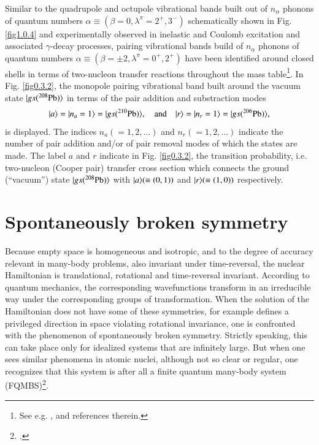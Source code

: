 Similar to the quadrupole and octupole vibrational bands built out of $n_\alpha$ phonons of quantum numbers $\alpha\equiv(\beta=0,\lambda^\pi=2^+,3^-)$ schematically shown in Fig. \ref{fig1.0.4} and experimentally observed in inelastic and Coulomb excitation and associated $\gamma$-decay processes, pairing vibrational bands build of $n_\alpha$ phonons of quantum numbers $\alpha\equiv(\beta=\pm2,\lambda^\pi=0^+,2^+)$ have been identified around closed shells in terms of two-nucleon transfer reactions throughout the mass table\footnote{See e.g. \cite{Flynn:71}, \cite{Flynn:72} and references therein.}. In Fig. \ref{fig0.3.2}, the monopole pairing vibrational band built around the vacuum state $|{gs(^{208}\text{Pb})} \rangle$ in terms of the pair addition and substraction modes
\begin{align}\label{eq1.3.9}
|{a} \rangle=|{n_a=1} \rangle=|{gs(^{210}\text{Pb})} \rangle,\quad\text{and}\quad |{r} \rangle=|{n_r=1} \rangle=|{gs(^{206}\text{Pb})} \rangle,
\end{align}
is displayed. The indices $n_a(=1,2,\dots)$ and $n_r(=1,2,\dots)$ indicate the number of pair addition and/or of pair removal modes of which the states are made. The label $a$ and $r$ indicate in Fig. \ref{fig0.3.2}, the  transition probability, i.e. two-nucleon (Cooper pair) transfer cross section which connects the ground (``vacuum'') state $|{gs(^{208}\text{Pb})} \rangle$ with $|{a} \rangle(\equiv(0,1))$ and $|{r} \rangle(\equiv(1,0))$ respectively. 
\section{Spontaneously broken symmetry}\label{S1.4}
Because empty space is homogeneous and isotropic, and to the degree of accuracy relevant in many-body problems, also invariant under time-reversal, the nuclear Hamiltonian is translational, rotational and time-reversal invariant. According to quantum mechanics, the corresponding wavefunctions transform in an irreducible way under the corresponding groups of transformation.
When the solution  of the Hamiltonian does not have some of these symmetries, for example defines a privileged direction in space violating rotational invariance, one is confronted with the phenomenon of spontaneously broken symmetry. Strictly speaking, this can take place only for idealized systems that are infinitely large. But when one sees similar phenomena in atomic nuclei, although not so clear or regular, one recognizes that this system is after all a finite quantum many-body system (FQMBS)\footnote{\cite{Anderson:72,Anderson:84b}.}.
